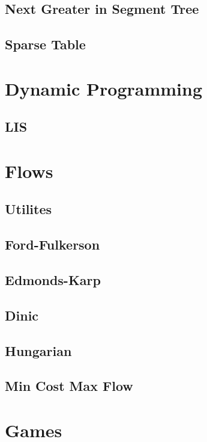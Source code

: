 \subsection{Next Greater in Segment Tree}

\subsection{Sparse Table}



\section{Dynamic Programming}

\subsection{LIS}



\section{Flows}

\subsection{Utilites}

\subsection{Ford-Fulkerson}

\subsection{Edmonds-Karp}

\subsection{Dinic}

\subsection{Hungarian}

\subsection{Min Cost Max Flow}



\section{Games}

